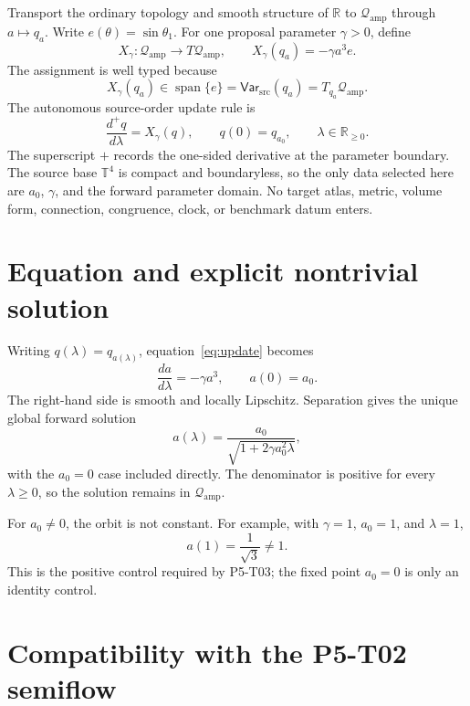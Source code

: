 \documentclass[11pt]{article}
\newcommand{\Qamp}{\mathcal Q_{\mathrm{amp}}}
\newcommand{\Var}{\mathsf{Var}_{\mathrm{src}}}
\begin{document}
Transport the ordinary topology and smooth structure of \(\mathbb R\) to
\(\Qamp\) through \(a\mapsto q_a\).  Write
\(e(\theta)=\sin\theta_1\).  For one proposal parameter \(\gamma>0\), define
\[
 X_\gamma:\Qamp\longrightarrow T\Qamp,\qquad
 X_\gamma(q_a)=-\gamma a^3e .
\]
The assignment is well typed because
\[
 X_\gamma(q_a)\in
 \operatorname{span}\{e\}=\Var(q_a)=T_{q_a}\Qamp .
\]
The autonomous source-order update rule is
\begin{equation}
 \frac{d^+q}{d\lambda}=X_\gamma(q),
 \qquad
 q(0)=q_{a_0},
 \qquad
 \lambda\in\mathbb R_{\geq0}.
 \label{eq:update}
\end{equation}
The superscript \(+\) records the one-sided derivative at the parameter
boundary.  The source base \(\mathbb T^4\) is compact and boundaryless, so the
only data selected here are \(a_0\), \(\gamma\), and the forward parameter
domain.  No target atlas, metric, volume form, connection, congruence, clock,
or benchmark datum enters.

\section{Equation and explicit nontrivial solution}

Writing \(q(\lambda)=q_{a(\lambda)}\), equation~\eqref{eq:update} becomes
\begin{equation}
 \frac{da}{d\lambda}=-\gamma a^3,
 \qquad a(0)=a_0 .
 \label{eq:amplitude}
\end{equation}
The right-hand side is smooth and locally Lipschitz.  Separation gives the
unique global forward solution
\begin{equation}
 a(\lambda)
 =
 \frac{a_0}{\sqrt{1+2\gamma a_0^2\lambda}},
 \label{eq:solution}
\end{equation}
with the \(a_0=0\) case included directly.  The denominator is positive for
every \(\lambda\geq0\), so the solution remains in \(\Qamp\).

For \(a_0\neq0\), the orbit is not constant.  For example, with
\(\gamma=1\), \(a_0=1\), and \(\lambda=1\),
\[
 a(1)=\frac1{\sqrt3}\neq1 .
\]
This is the positive control required by P5-T03; the fixed point \(a_0=0\) is
only an identity control.

\section{Compatibility with the P5-T02 semiflow}
\end{document}
